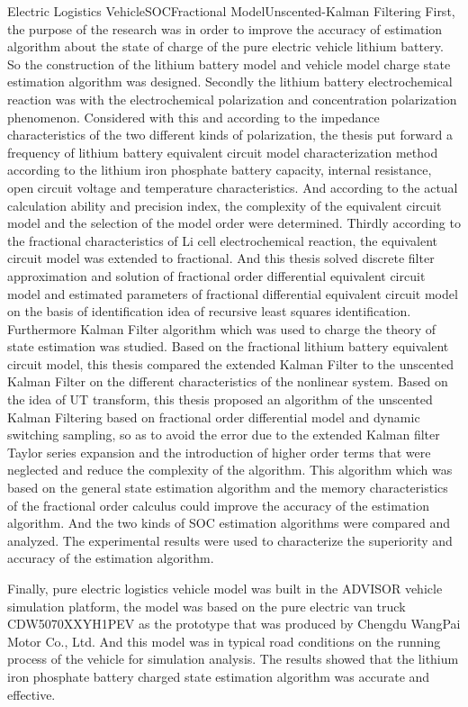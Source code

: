 \begin{Eabstract}{Electric Logistics Vehicle}{SOC}{Fractional Model}{Unscented-Kalman Filtering}{}
	First, the purpose of the research was in order to improve the accuracy of estimation algorithm about the state of charge of the pure electric vehicle lithium battery. So the construction of the lithium battery model and vehicle model charge state estimation algorithm was designed. Secondly the lithium battery electrochemical reaction was with the electrochemical polarization and concentration polarization phenomenon. Considered with this and according to the impedance characteristics of the two different kinds of polarization, the thesis put forward a frequency of lithium battery equivalent circuit model characterization method according to the lithium iron phosphate battery capacity, internal resistance, open circuit voltage and temperature characteristics. And according to the actual calculation ability and precision index, the complexity of the equivalent circuit model and the selection of the model order were determined. Thirdly according to the fractional characteristics of Li cell electrochemical reaction, the equivalent circuit model was extended to fractional. And this thesis solved discrete filter approximation and solution of fractional order differential equivalent circuit model and estimated parameters of fractional differential equivalent circuit model on the basis of identification idea of recursive least squares identification. Furthermore Kalman Filter algorithm which was used to charge the theory of state estimation was studied. Based on the fractional lithium battery equivalent circuit model, this thesis compared the extended Kalman Filter to the unscented Kalman Filter on the different characteristics of the nonlinear system. Based on the idea of UT transform, this thesis proposed an algorithm of the unscented Kalman Filtering based on fractional order differential model and dynamic switching sampling, so as to avoid the error due to the extended Kalman filter Taylor series expansion and the introduction of higher order terms that were neglected and reduce the complexity of the algorithm. This algorithm which was based on the general state estimation algorithm and the memory characteristics of the fractional order calculus could improve the accuracy of the estimation algorithm. And the two kinds of SOC estimation algorithms were compared and analyzed. The experimental results were used to characterize the superiority and accuracy of the estimation algorithm.

	Finally, pure electric logistics vehicle model was built in the ADVISOR vehicle simulation platform, the model was based on the pure electric van truck CDW5070XXYH1PEV as the prototype that was produced by Chengdu WangPai Motor Co., Ltd. And this model was in typical road conditions on the running process of the vehicle for simulation analysis. The results showed that the lithium iron phosphate battery charged state estimation algorithm was accurate and effective.
\end{Eabstract}
